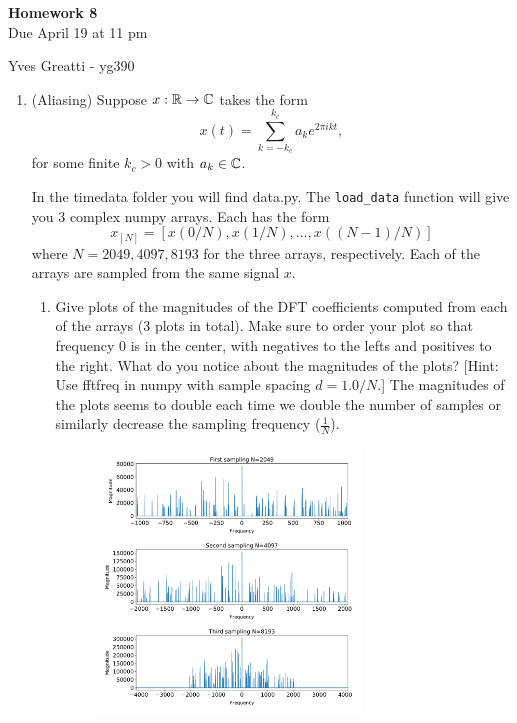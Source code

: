 \documentclass[12pt,twoside]{article}
\begin{document}
\begin{center}
{\large{\textbf{Homework 8}} } \vspace{0.2cm}\\
Due April 19 at 11 pm
\end{center}
Yves Greatti - yg390\\

\begin{enumerate}

 \item (Aliasing) Suppose $x:\mathbb{R}\to\mathbb{C}$ takes the form 
  $$x(t) = \sum_{k=-k_c}^{k_c} a_ke^{2\pi i kt},$$
  for some finite $k_c>0$ with $a_k\in\mathbb{C}$.  

  In the timedata folder you will find data.py.  The 
  \texttt{load\_data} function will give you 3 complex numpy arrays.  Each
  has the form
  $$x_{[N]}=[x(0/N),x(1/N),\ldots,x((N-1)/N)]$$
  where $N=2049,4097,8193$ for the three arrays, respectively.  Each of
  the arrays are sampled from the same signal $x$.
  \begin{enumerate}
  \item Give plots of the magnitudes of the DFT
    coefficients computed from each of the arrays (3 plots in total).
    Make sure to order your plot so
    that frequency 0 is in the center, with negatives to the lefts
    and positives to the right. What do you notice about the
    magnitudes of the plots?
    [Hint: Use fftfreq in numpy with sample spacing $d=1.0/N$.]
    The magnitudes of the plots seems to double each time we double the number of samples or similarly decrease
    the sampling frequency ($\frac{1}{N}$).
    
	\begin{figure}[H]
		\centering
		\captionsetup{justification=centering}
		\includegraphics[width=200pt]{code/timedata/question_1.pdf}
	\end{figure}
    

\end{enumerate}
\end{enumerate}
\end{document}
